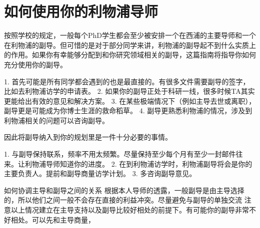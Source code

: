 \section{如何使用你的利物浦导师}
  按照学校的规定，一般每个PhD学生都会至少被安排一个在西浦的主要导师和一个在利物浦的副导。但可惜的是对于部分同学来讲，利物浦的副导起不到什么实质上的作用。如果你有幸能够分配到和你研究领域相关的副导，这篇指南将指导你如何充分使用你的副导。

  1. 首先可能是所有同学都会遇到的也是最直接的。有很多文件需要副导的签字，比如去利物浦访学的申请表。
  2. 如果你的副导正处于科研一线，很多时候TA其实更能给出有效的意见和解决方案。
  3. 在某些极端情况下（例如主导去世或离职），副导更是可能成为你博士生涯的救命稻草。
  4. 副导更熟悉利物浦的情况，涉及到利物浦相关的问题可以咨询副导。
  
  因此将副导纳入到你的规划里是一件十分必要的事情。
  
  1. 与副导保持联系，频率不用太频繁。尽量保持至少每个月有至少一封邮件往来。让利物浦导师知道你的进度。
  2. 在到利物浦访学时，利物浦副导将会是你的主要负责人。提前和副导商量访学计划。
  3. 多咨询副导意见。

  如何协调主导和副导之间的关系
  根据本人导师的透露，一般副导是由主导选择的，所以他们之间一般不会存在直接的利益冲突。尽量避免与副导的单独交流
  注意以上情况建立在主导支持以及副导比较好相处的前提下。有可能你的副导非常不好相处。可以先和主导商量，
